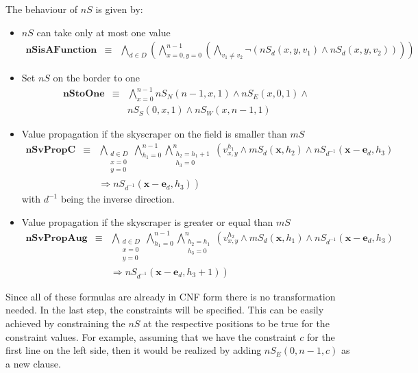 \documentclass[a4paper, 12pt, titlepage]{article}
\begin{document}
The behaviour of $nS$ is given by:
\begin{itemize}
	
\item $nS$ can take only at most one value
	\begin{eqnarray}
		\pmb{nSisAFunction} &\equiv& \bigwedge_{d\in D} \left( \bigwedge_{x=0,y=0}^{n-1} \left( \bigwedge_{v_1 \not = v_2} \neg \left( nS_{d}(x,y,v_1) \wedge nS_{d}(x,y,v_2) \right) \right) \right)
	\end{eqnarray}
	
\item Set $nS$ on the border to one
	\begin{eqnarray}
		\pmb{nStoOne} &\equiv& \bigwedge_{x=0}^{n-1} nS_{N}(n-1,x,1) \wedge nS_{E}(x,0,1) \wedge \nonumber \\
	&&  nS_{S}(0,x,1) \wedge nS_{W}(x,n-1,1)
	\end{eqnarray}
	
\item Value propagation if the skyscraper on the field is smaller than $mS$
	\begin{eqnarray}
		\pmb{nSvPropC} &\equiv& \bigwedge_{\substack{d\in D\\x=0\\y=0}} \bigwedge_{h_{1}=0}^{n-1} \bigwedge_{\substack{h_{2} = h_{1}+1\\h_{3}=0}}^{n} \left( v_{x,y}^{h_1} \wedge mS_d(\pmb x,h_2) \wedge nS_{d^{-1}}(\pmb x - \pmb e_d,h_3) \right. \nonumber \\
	&& \left.\Rightarrow nS_{d^{-1}}(\pmb x - \pmb e_d,h_3) \right)
	\end{eqnarray}
	with $d^{-1}$ being the inverse direction.

	\item Value propagation if the skyscraper is greater or equal than $mS$
	\begin{eqnarray}
		\pmb{nSvPropAug} &\equiv& \bigwedge_{\substack{d\in D\\x=0\\y=0}} \bigwedge_{h_{1}=0}^{n-1} \bigwedge_{\substack{h_{2} = h_{1}\\h_{3}=0}}^{n} \left( v_{x,y}^{h_2} \wedge mS_d(\pmb x,h_1) \wedge nS_{d^{-1}}(\pmb x - \pmb e_d,h_3) \right. \nonumber \\
	&& \left.\Rightarrow nS_{d^{-1}}(\pmb x - \pmb e_d,h_3+1) \right)
	\end{eqnarray}
\end{itemize}

Since all of these formulas are already in CNF form there is no transformation needed. In the last step, the constraints will be specified. This can be easily achieved by constraining the $nS$ at the respective positions to be true for the constraint values. For example, assuming that we have the constraint $c$ for the first line on the left side, then it would be realized by adding $nS_{E}(0,n-1,c)$ as a new clause.
\end{document}

